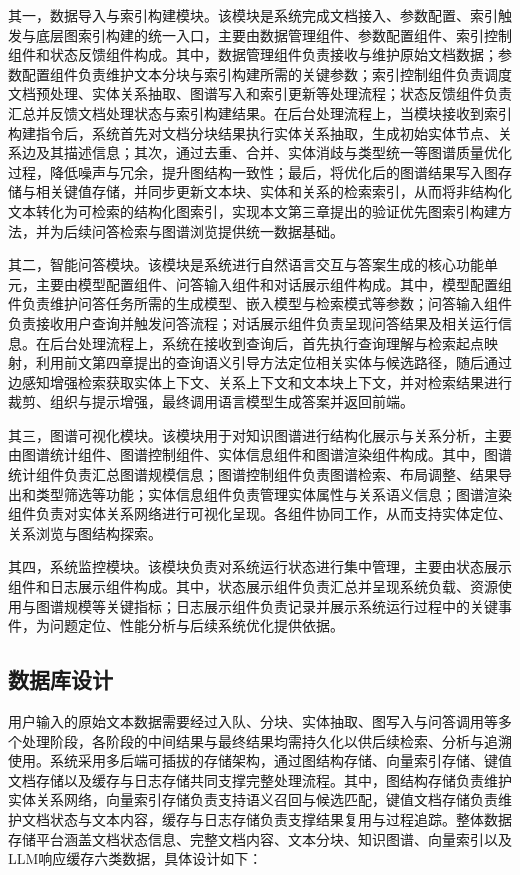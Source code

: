 \documentclass[promaster, vlined]{DissertUESTC}
\begin{document}
其一，数据导入与索引构建模块。该模块是系统完成文档接入、参数配置、索引触发与底层图索引构建的统一入口，主要由数据管理组件、参数配置组件、索引控制组件和状态反馈组件构成。其中，数据管理组件负责接收与维护原始文档数据；参数配置组件负责维护文本分块与索引构建所需的关键参数；索引控制组件负责调度文档预处理、实体关系抽取、图谱写入和索引更新等处理流程；状态反馈组件负责汇总并反馈文档处理状态与索引构建结果。在后台处理流程上，当模块接收到索引构建指令后，系统首先对文档分块结果执行实体关系抽取，生成初始实体节点、关系边及其描述信息；其次，通过去重、合并、实体消歧与类型统一等图谱质量优化过程，降低噪声与冗余，提升图结构一致性；最后，将优化后的图谱结果写入图存储与相关键值存储，并同步更新文本块、实体和关系的检索索引，从而将非结构化文本转化为可检索的结构化图索引，实现本文第三章提出的验证优先图索引构建方法，并为后续问答检索与图谱浏览提供统一数据基础。

其二，智能问答模块。该模块是系统进行自然语言交互与答案生成的核心功能单元，主要由模型配置组件、问答输入组件和对话展示组件构成。其中，模型配置组件负责维护问答任务所需的生成模型、嵌入模型与检索模式等参数；问答输入组件负责接收用户查询并触发问答流程；对话展示组件负责呈现问答结果及相关运行信息。在后台处理流程上，系统在接收到查询后，首先执行查询理解与检索起点映射，利用前文第四章提出的查询语义引导方法定位相关实体与候选路径，随后通过边感知增强检索获取实体上下文、关系上下文和文本块上下文，并对检索结果进行裁剪、组织与提示增强，最终调用语言模型生成答案并返回前端。

其三，图谱可视化模块。该模块用于对知识图谱进行结构化展示与关系分析，主要由图谱统计组件、图谱控制组件、实体信息组件和图谱渲染组件构成。其中，图谱统计组件负责汇总图谱规模信息；图谱控制组件负责图谱检索、布局调整、结果导出和类型筛选等功能；实体信息组件负责管理实体属性与关系语义信息；图谱渲染组件负责对实体关系网络进行可视化呈现。各组件协同工作，从而支持实体定位、关系浏览与图结构探索。

其四，系统监控模块。该模块负责对系统运行状态进行集中管理，主要由状态展示组件和日志展示组件构成。其中，状态展示组件负责汇总并呈现系统负载、资源使用与图谱规模等关键指标；日志展示组件负责记录并展示系统运行过程中的关键事件，为问题定位、性能分析与后续系统优化提供依据。


\subsection{数据库设计}

用户输入的原始文本数据需要经过入队、分块、实体抽取、图写入与问答调用等多个处理阶段，各阶段的中间结果与最终结果均需持久化以供后续检索、分析与追溯使用。系统采用多后端可插拔的存储架构，通过图结构存储、向量索引存储、键值文档存储以及缓存与日志存储共同支撑完整处理流程。其中，图结构存储负责维护实体关系网络，向量索引存储负责支持语义召回与候选匹配，键值文档存储负责维护文档状态与文本内容，缓存与日志存储负责支撑结果复用与过程追踪。整体数据存储平台涵盖文档状态信息、完整文档内容、文本分块、知识图谱、向量索引以及LLM响应缓存六类数据，具体设计如下：
\end{document}
